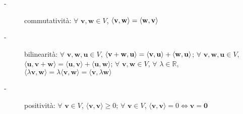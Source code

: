 \documentclass{article}
\begin{document}
\begin{description}
\item[-] commutativit\`{a}: $\forall $ $\mathbf{v,w}\in V$, $\langle \mathbf{%
v,w}\rangle =\langle \mathbf{w,v}\rangle $

\item[-] bilinearit\`{a}: $\forall $ $\mathbf{v,w,u}\in V$, $\langle \mathbf{%
v+w,u}\rangle =\langle \mathbf{v,u}\rangle +\langle \mathbf{w,u}\rangle $; $%
\forall $ $\mathbf{v,w,u}\in V$, $\langle \mathbf{u,v+w}\rangle =\langle 
\mathbf{u,v}\rangle +\langle \mathbf{u,w}\rangle $; $\forall $ $\mathbf{v,w}%
\in V$, $\forall $ $\lambda \in 
\mathbb{R}
$, $\langle \lambda \mathbf{v,w}\rangle =\lambda \langle \mathbf{v,w}\rangle
=\langle \mathbf{v,}\lambda \mathbf{w}\rangle $

\item[-] positivit\`{a}: $\forall $ $\mathbf{v}\in V$, $\langle \mathbf{v,v}%
\rangle \geq 0$; $\forall $ $\mathbf{v}\in V$, $\langle \mathbf{v,v}\rangle
=0\Longleftrightarrow \mathbf{v=0}$
\end{description}
\end{document}
